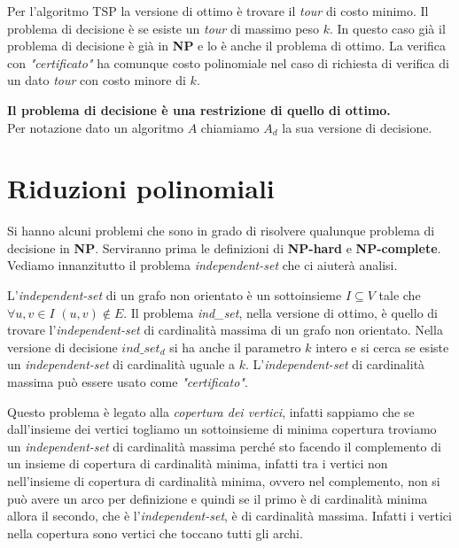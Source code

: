 \begin{esempio}
  Per l'algoritmo TSP la versione di ottimo è trovare il \emph{tour} di costo
  minimo. Il problema di decisione è se esiste un \emph{tour} di massimo peso
  $k$. In questo caso già il problema di decisione è già in \textbf{NP} e lo è
  anche il problema di ottimo. La verifica con \textit{"certificato"} ha comunque costo
  polinomiale nel caso di richiesta di verifica di un dato \emph{tour} con costo
  minore di $k$. 
\end{esempio}
\textbf{Il problema di decisione è una restrizione di quello di ottimo.}\\
Per notazione dato un algoritmo $A$ chiamiamo $A_d$ la sua versione di
decisione.\\
\section{Riduzioni polinomiali}
Si hanno alcuni problemi che sono in grado di risolvere qualunque problema di
decisione in \textbf{NP}. Serviranno prima le definizioni di \textbf{NP-hard} e
\textbf{NP-complete}.\\
Vediamo innanzitutto il problema \textit{independent-set} che ci aiuterà
analisi.
\begin{definizione}
  L'\textit{independent-set } di un grafo non orientato è un sottoinsieme
  $I\subseteq V$ tale che $\forall u,v\in I$ $(u,v)\not\in E$. Il problema
  \textit{ind\_set}, nella versione di ottimo, è quello di trovare
  l'\textit{independent-set} di cardinalità massima di un grafo non
  orientato. Nella versione di decisione $ind\_set_d$ si ha anche il parametro
  $k$ intero e si cerca se esiste un \textit{independent-set} di cardinalità
  uguale a $k$. L'\textit{independent-set} di cardinalità massima può essere
  usato come \textit{"certificato"}.
\end{definizione}
Questo problema è legato alla \textit{copertura dei vertici}, infatti sappiamo
che se dall'insieme dei vertici togliamo un sottoinsieme di minima copertura
troviamo un \textit{independent-set} di cardinalità massima perché sto facendo
il complemento di un insieme di copertura di cardinalità minima, infatti tra i
vertici non nell'insieme di copertura di cardinalità minima, ovvero nel
complemento, non si può avere un arco per definizione e quindi se il primo è di
cardinalità minima allora il secondo, che è l'\textit{independent-set}, è di
cardinalità massima. Infatti i vertici nella copertura sono vertici che toccano
tutti gli archi.\\

